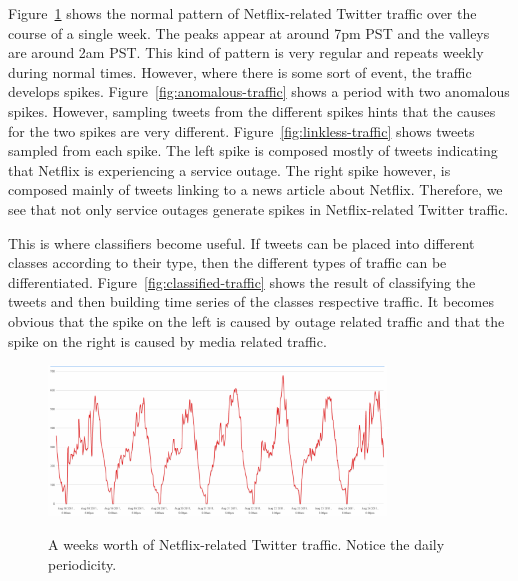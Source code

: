 \documentclass[12pt]{ucthesis}
\newcommand{\captionfonts}{\small\bf\ssp}
\begin{document}
Figure~\ref{fig:normal-traffic} shows the normal pattern of Netflix-related Twitter traffic over the course of a single week.
The peaks appear at around 7pm PST and the valleys are around 2am PST.
This kind of pattern is very regular and repeats weekly during normal times.
However, where there is some sort of event, the traffic develops spikes. Figure~\ref{fig:anomalous-traffic} shows a period with two
anomalous spikes. However, sampling tweets from the different spikes hints that the causes for the two spikes
are very different. Figure~\ref{fig:linkless-traffic} shows tweets sampled from each spike. The left spike is composed mostly
of tweets indicating that Netflix is experiencing a service outage. The right spike however, is composed mainly of tweets linking to
a news article about Netflix. Therefore, we see that not only service outages generate spikes in Netflix-related Twitter traffic.

This is where classifiers become useful. If tweets can be placed into different classes according to their type,
then the different types of traffic can be differentiated. Figure~\ref{fig:classified-traffic} shows the result of classifying
the tweets and then building time series of the classes respective traffic. It becomes obvious that the spike on the left is caused by
outage related traffic and that the spike on the right is caused by media related traffic.

\begin{figure}
   \begin{center}
      \includegraphics[width=0.8\textwidth]{images/Normal_Traffic.eps}
      \captionfonts
      \caption[Normal Traffic]{A weeks worth of Netflix-related Twitter traffic. Notice the daily periodicity.}
      \label{fig:normal-traffic}
   \end{center}
\end{figure}
\end{document}
